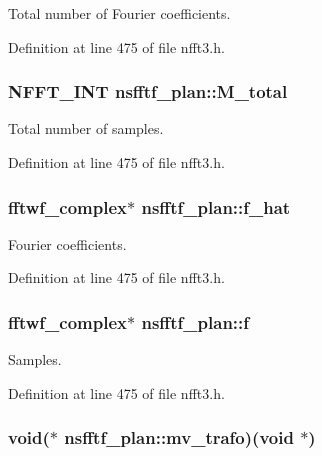 Total number of Fourier coefficients. 



Definition at line 475 of file nfft3.\-h.

\hypertarget{structnsfftf__plan_aec743750e5f2a87a8f60c2d308207530}{
\subsubsection[{M\-\_\-total}]{\setlength{\rightskip}{0pt plus 5cm}N\-F\-F\-T\-\_\-\-I\-N\-T nsfftf\-\_\-plan\-::\-M\-\_\-total}}\label{structnsfftf__plan_aec743750e5f2a87a8f60c2d308207530}


Total number of samples. 



Definition at line 475 of file nfft3.\-h.

\hypertarget{structnsfftf__plan_a423d4a1555477e49a7cb3c26a4a5dfd1}{
\subsubsection[{f\-\_\-hat}]{\setlength{\rightskip}{0pt plus 5cm}fftwf\-\_\-complex$\ast$ nsfftf\-\_\-plan\-::f\-\_\-hat}}\label{structnsfftf__plan_a423d4a1555477e49a7cb3c26a4a5dfd1}


Fourier coefficients. 



Definition at line 475 of file nfft3.\-h.

\hypertarget{structnsfftf__plan_aa2cda7d4bb129ad3dfd6b89682c28cd6}{
\subsubsection[{f}]{\setlength{\rightskip}{0pt plus 5cm}fftwf\-\_\-complex$\ast$ nsfftf\-\_\-plan\-::f}}\label{structnsfftf__plan_aa2cda7d4bb129ad3dfd6b89682c28cd6}


Samples. 



Definition at line 475 of file nfft3.\-h.

\hypertarget{structnsfftf__plan_ac698248a376958d67a10beecfdc3aa36}{
\subsubsection[{mv\-\_\-trafo}]{\setlength{\rightskip}{0pt plus 5cm}void($\ast$ nsfftf\-\_\-plan\-::mv\-\_\-trafo)(void $\ast$)}}\label{structnsfftf__plan_ac698248a376958d67a10beecfdc3aa36}


